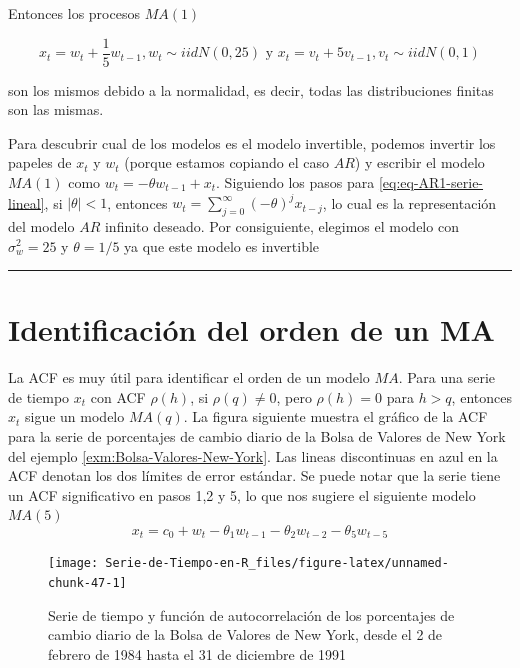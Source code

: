 \documentclass[12pt,]{krantz}
\theoremstyle{definition}
\theoremstyle{definition}
\theoremstyle{definition}
\theoremstyle{remark}
\begin{document}
Entonces los procesos \(MA(1)\)

\[x_t=w_t+\frac{1}{5}w_{t-1}, w_t\sim iidN(0,25)\text{  y  } x_t=v_t+5v_{t-1},  v_t\sim iidN(0,1)\]

son los mismos debido a la normalidad, es decir, todas las
distribuciones finitas son las mismas.

Para descubrir cual de los modelos es el modelo invertible, podemos
invertir los papeles de \(x_t\) y \(w_t\) (porque estamos copiando el
caso \(AR\)) y escribir el modelo \(MA(1)\) como
\(w_t=-\theta w_{t-1}+x_t\). Siguiendo los pasos para
\eqref{eq:eq-AR1-serie-lineal}, si \(|\theta|<1\), entonces
\(w_t=\sum_{j=0}^{\infty}(-\theta)^jx_{t-j}\), lo cual es la
representación del modelo \(AR\) infinito deseado. Por consiguiente,
elegimos el modelo con \(\sigma_w^2=25\) y \(\theta=1/5\) ya que este
modelo es invertible

\begin{center}\rule{0.5\linewidth}{\linethickness}\end{center}

\section{Identificación del orden de un
MA}\label{identificacion-del-orden-de-un-ma}

La ACF es muy útil para identificar el orden de un modelo \(MA\). Para
una serie de tiempo \(x_t\) con ACF \(\rho(h)\), si \(\rho(q)\neq0\),
pero \(\rho(h)=0\) para \(h>q\), entonces \(x_t\) sigue un modelo
\(MA(q)\). La figura siguiente muestra el gráfico de la ACF para la
serie de porcentajes de cambio diario de la Bolsa de Valores de New York
del ejemplo \ref{exm:Bolsa-Valores-New-York}. Las lineas discontinuas en
azul en la ACF denotan los dos límites de error estándar. Se puede notar
que la serie tiene un ACF significativo en pasos 1,2 y 5, lo que nos
sugiere el siguiente modelo \(MA(5)\)
\[x_t=c_0+w_t-\theta_1w_{t-1}-\theta_2w_{t-2}-\theta_5w_{t-5}\]

\begin{figure}

{\centering \texttt{[image: Serie-de-Tiempo-en-R\_files/figure-latex/unnamed-chunk-47-1]} 

}

\caption{Serie de tiempo y función de autocorrelación de los porcentajes de cambio diario de la Bolsa de Valores de New York, desde el 2 de febrero de 1984 hasta el 31 de diciembre de 1991}\label{fig:unnamed-chunk-47}
\end{figure}
\end{document}
